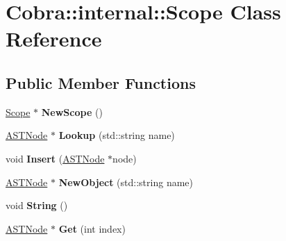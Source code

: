 \hypertarget{class_cobra_1_1internal_1_1_scope}{\section{Cobra\+:\+:internal\+:\+:Scope Class Reference}
\label{class_cobra_1_1internal_1_1_scope}
}
\subsection*{Public Member Functions}
\begin{DoxyCompactItemize}
\item 
\hypertarget{class_cobra_1_1internal_1_1_scope_a09b8ae8424fe6fd833fe543575872d1a}{\hyperlink{class_cobra_1_1internal_1_1_scope}{Scope} $\ast$ {\bfseries New\+Scope} ()}\label{class_cobra_1_1internal_1_1_scope_a09b8ae8424fe6fd833fe543575872d1a}

\item 
\hypertarget{class_cobra_1_1internal_1_1_scope_acfcc98102d21e2a5ecc20316be343b16}{\hyperlink{class_cobra_1_1internal_1_1_a_s_t_node}{A\+S\+T\+Node} $\ast$ {\bfseries Lookup} (std\+::string name)}\label{class_cobra_1_1internal_1_1_scope_acfcc98102d21e2a5ecc20316be343b16}

\item 
\hypertarget{class_cobra_1_1internal_1_1_scope_a9a3ba5f69a60e821246b2234d7648508}{void {\bfseries Insert} (\hyperlink{class_cobra_1_1internal_1_1_a_s_t_node}{A\+S\+T\+Node} $\ast$node)}\label{class_cobra_1_1internal_1_1_scope_a9a3ba5f69a60e821246b2234d7648508}

\item 
\hypertarget{class_cobra_1_1internal_1_1_scope_a601879b5f10c0f3095e935a03169cce5}{\hyperlink{class_cobra_1_1internal_1_1_a_s_t_node}{A\+S\+T\+Node} $\ast$ {\bfseries New\+Object} (std\+::string name)}\label{class_cobra_1_1internal_1_1_scope_a601879b5f10c0f3095e935a03169cce5}

\item 
\hypertarget{class_cobra_1_1internal_1_1_scope_aaebe9d128689e9bf14661ee56cf23fa6}{void {\bfseries String} ()}\label{class_cobra_1_1internal_1_1_scope_aaebe9d128689e9bf14661ee56cf23fa6}

\item 
\hypertarget{class_cobra_1_1internal_1_1_scope_a3d2c6d4045bacad731303aabb2babfb1}{\hyperlink{class_cobra_1_1internal_1_1_a_s_t_node}{A\+S\+T\+Node} $\ast$ {\bfseries Get} (int index)}\label{class_cobra_1_1internal_1_1_scope_a3d2c6d4045bacad731303aabb2babfb1}


\end{DoxyCompactItemize}
